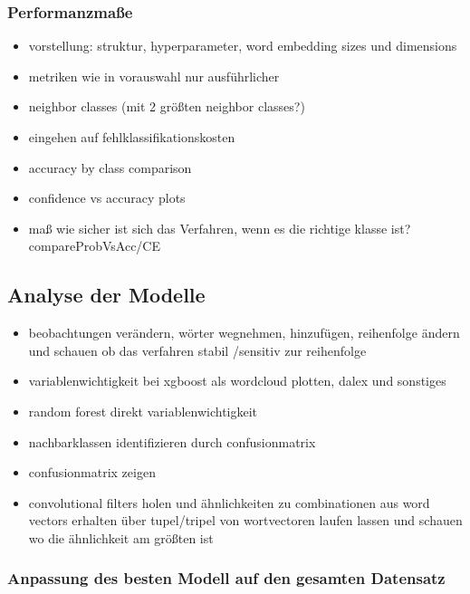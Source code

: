 \documentclass[a4paper,11pt]{article}
\begin{document}
\subsubsection{Performanzmaße}

\begin{itemize}
\item vorstellung: struktur, hyperparameter, word embedding sizes und dimensions
    \item metriken wie in vorauswahl nur ausführlicher
    \item neighbor classes (mit 2 größten neighbor classes?)
    \item eingehen auf fehlklassifikationskosten
    \item accuracy by class comparison
    \item confidence vs accuracy plots
    \item maß wie sicher ist sich das Verfahren, wenn es die richtige klasse ist? compareProbVsAcc/CE
\end{itemize}{}

\subsection{Analyse der Modelle}

\begin{itemize}

    \item beobachtungen verändern, wörter wegnehmen, hinzufügen, reihenfolge ändern und schauen ob das verfahren stabil /sensitiv zur reihenfolge
    \item variablenwichtigkeit bei xgboost als wordcloud plotten, dalex und sonstiges
    \item random forest direkt variablenwichtigkeit
    \item nachbarklassen identifizieren durch confusionmatrix
    \item confusionmatrix zeigen
    \item convolutional filters holen und ähnlichkeiten zu combinationen aus word vectors erhalten über tupel/tripel von wortvectoren laufen lassen und schauen wo die ähnlichkeit am größten ist
\end{itemize}{}

\subsubsection{Anpassung des besten Modell auf den gesamten Datensatz}
\end{document}

